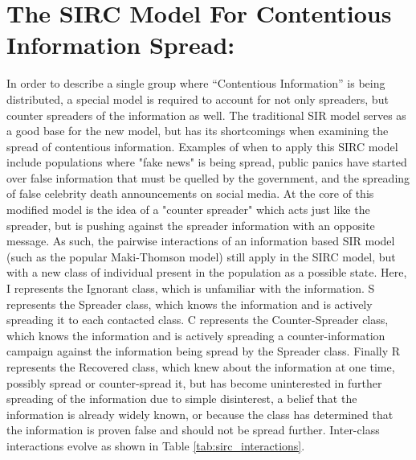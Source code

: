 \chapter{The SIRC Model For Contentious Information Spread:} \label{ch:SIRC} %

In order to describe a single group where ``Contentious Information'' is being distributed, a special model is required to account for not only spreaders, but counter spreaders of the information as well. The traditional SIR model serves as a good base for the new model, but has its shortcomings when examining the spread of contentious information. Examples of when to apply this SIRC model include populations where "fake news" is being spread, public panics have started over false information that must be quelled by the government, and the spreading of false celebrity death announcements on social media. At the core of this modified model is the idea of a "counter spreader" which acts just like the spreader, but is pushing against the spreader information with an opposite message. As such, the pairwise interactions of an information based SIR model (such as the popular Maki-Thomson model) still apply in the SIRC model, but with a new class of individual present in the population as a possible state. Here, I represents the Ignorant class, which is unfamiliar with the information. S represents the Spreader class, which knows the information and is actively spreading it to each contacted class. C represents the Counter-Spreader class, which knows the information and is actively spreading a counter-information campaign against the information being spread by the Spreader class. Finally R represents the Recovered class, which knew about the information at one time, possibly spread or counter-spread it, but has become uninterested in further spreading of the information due to simple disinterest, a belief that the information is already widely known, or because the class has determined that the information is proven false and should not be spread further. Inter-class interactions evolve as shown in Table \ref{tab:sirc_interactions}.

